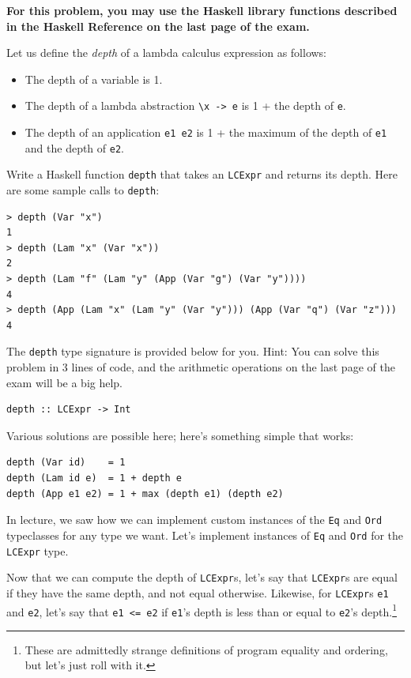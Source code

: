 \documentclass[addpoints]{exam}
\begin{document}
\begin{questions}
\newpage

\question[15] \textbf{For this problem, you may use the Haskell library functions described in the Haskell Reference on the last page of the exam.}

Let us define the \emph{depth} of a lambda calculus expression as follows:

\begin{itemize}
\item The depth of a variable is 1.
\item The depth of a lambda abstraction \verb|\x -> e| is 1 + the depth of \texttt{e}.
\item The depth of an application \texttt{e1 e2} is 1 + the maximum of the depth of \texttt{e1} and the depth of \texttt{e2}.
\end{itemize}

Write a Haskell function \texttt{depth} that takes an \texttt{LCExpr} and returns its depth.  Here are some sample calls to \texttt{depth}:

\begin{verbatim}
> depth (Var "x")
1
> depth (Lam "x" (Var "x"))
2
> depth (Lam "f" (Lam "y" (App (Var "g") (Var "y"))))
4
> depth (App (Lam "x" (Lam "y" (Var "y"))) (App (Var "q") (Var "z")))
4
\end{verbatim}

The \texttt{depth} type signature is provided below for you.  Hint: You can solve this problem in 3 lines of code, and the arithmetic operations on the last page of the exam will be a big help.

\begin{verbatim}
depth :: LCExpr -> Int
\end{verbatim}
\begin{solutionorbox}[2in]
Various solutions are possible here; here's something simple that works:
\begin{verbatim}
depth (Var id)    = 1
depth (Lam id e)  = 1 + depth e
depth (App e1 e2) = 1 + max (depth e1) (depth e2)
\end{verbatim}
\end{solutionorbox}

\newpage

\question In lecture, we saw how we can implement custom instances of the \texttt{Eq} and \texttt{Ord} typeclasses for any type we want.  Let's implement instances of \texttt{Eq} and \texttt{Ord} for the \texttt{LCExpr} type.

Now that we can compute the depth of \texttt{LCExpr}s, let's say that \texttt{LCExpr}s are equal if they have the same depth, and not equal otherwise.  Likewise, for \texttt{LCExpr}s \texttt{e1} and \texttt{e2}, let's say that \verb|e1 <= e2| if \texttt{e1}'s depth is less than or equal to \texttt{e2}'s depth.\footnote{These are admittedly strange definitions of program equality and ordering, but let's just roll with it.}


\end{questions}
\end{document}
